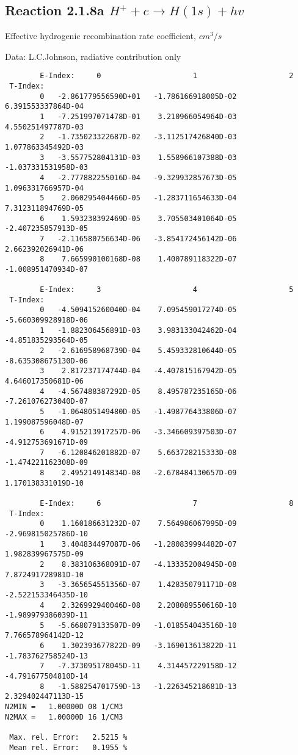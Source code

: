 \documentclass[12pt,dvipdfmx]{article}
\begin{document}
\subsection{
  Reaction 2.1.8a  $H^+ + e \rightarrow H(1s) + hv $
}

   Effective hydrogenic recombination rate coefficient, $cm^3/s$

   Data: L.C.Johnson, radiative contribution only


\begin{small}\begin{verbatim}
        E-Index:     0                     1                     2
 T-Index:
        0   -2.861779556590D+01   -1.786166918005D-02    6.391553337864D-04
        1   -7.251997071478D-01    3.210966054964D-03    4.550251497787D-03
        2   -1.735023322687D-02   -3.112517426840D-03    1.077863345492D-03
        3   -3.557752804131D-03    1.558966107388D-03   -1.037331531958D-03
        4   -2.777882255016D-04   -9.329932857673D-05    1.096331766957D-04
        5    2.060295404466D-05   -1.283711654633D-04    7.312311894769D-05
        6    1.593238392469D-05    3.705503401064D-05   -2.407235857913D-05
        7   -2.116580756634D-06   -3.854172456142D-06    2.662392026941D-06
        8    7.665990100168D-08    1.400789118322D-07   -1.008951470934D-07

        E-Index:     3                     4                     5
 T-Index:
        0   -4.509415260040D-04    7.095459017274D-05   -5.660309928918D-06
        1   -1.882306456891D-03    3.983133042462D-04   -4.851835293564D-05
        2   -2.616958968739D-04    5.459332810644D-05   -8.635308675130D-06
        3    2.817237174744D-04   -4.407815167942D-05    4.646017350681D-06
        4   -4.567488387292D-05    8.495787235165D-06   -7.261076273040D-07
        5   -1.064805149480D-05   -1.498776433806D-07    1.199087596048D-07
        6    4.915213917257D-06   -3.346609397503D-07   -4.912753691671D-09
        7   -6.120846201882D-07    5.663728215333D-08   -1.474221162308D-09
        8    2.495214914834D-08   -2.678484130657D-09    1.170138331019D-10

        E-Index:     6                     7                     8
 T-Index:
        0    1.160186631232D-07    7.564986067995D-09   -2.969815025786D-10
        1    3.404834497087D-06   -1.280839994482D-07    1.982839967575D-09
        2    8.383106368091D-07   -4.133352004945D-08    7.872491728981D-10
        3   -3.365654551356D-07    1.428350791171D-08   -2.522153346435D-10
        4    2.326992940046D-08    2.208089550616D-10   -1.989979386039D-11
        5   -5.668079133507D-09   -1.018554043516D-10    7.766578964142D-12
        6    1.302393677822D-09   -3.169013613822D-11   -1.783762758524D-13
        7   -7.373095178045D-11    4.314457229158D-12   -4.791677504810D-14
        8   -1.588254701759D-13   -1.226345218681D-13    2.329402447113D-15
N2MIN =   1.00000D 08 1/CM3
N2MAX =   1.00000D 16 1/CM3

 Max. rel. Error:   2.5215 %
 Mean rel. Error:   0.1955 %


\end{verbatim}\end{small}
\end{document}
